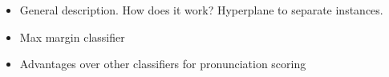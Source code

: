 \begin{itemize}
	\item General description. How does it work? Hyperplane to separate instances.
	\item Max margin classifier
	\item Advantages over other classifiers for pronunciation scoring
\end{itemize}